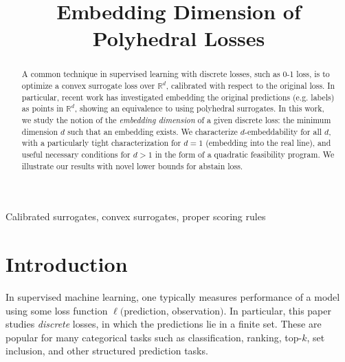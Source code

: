 \documentclass[anon]{colt2020} %
\title[Embedding dimension]{Embedding Dimension of Polyhedral Losses}
\newcommand{\reals}{\mathbb{R}}
\newcommand{\Ind}[1]{\mathbf{1}\{#1\}}
\begin{document}
\maketitle

\begin{abstract}%
  A common technique in supervised learning with discrete losses, such as 0-1 loss, is to optimize a convex surrogate loss over $\reals^d$, calibrated with respect to the original loss.
  In particular, recent work has investigated embedding the original predictions (e.g. labels) as points in $\reals^d$, showing an equivalence to using polyhedral surrogates.
  In this work, we study the notion of the \emph{embedding dimension} of a given discrete loss: the minimum dimension $d$ such that an embedding exists.
  We characterize $d$-embeddability for all $d$, with a particularly tight characterization for $d=1$ (embedding into the real line), and useful necessary conditions for $d>1$ in the form of a quadratic feasibility program.
  We illustrate our results with novel lower bounds for abstain loss.
\end{abstract}

\begin{keywords}%
  Calibrated surrogates, convex surrogates, proper scoring rules%
\end{keywords}


\section{Introduction}
In supervised machine learning, one typically measures performance of a model using some loss function $\ell($prediction, observation$)$.
In particular, this paper studies \emph{discrete} losses, in which the predictions lie in a finite set.
These are popular for many categorical tasks such as classification, ranking, top-$k$, set inclusion, and other structured prediction tasks.
\end{document}
